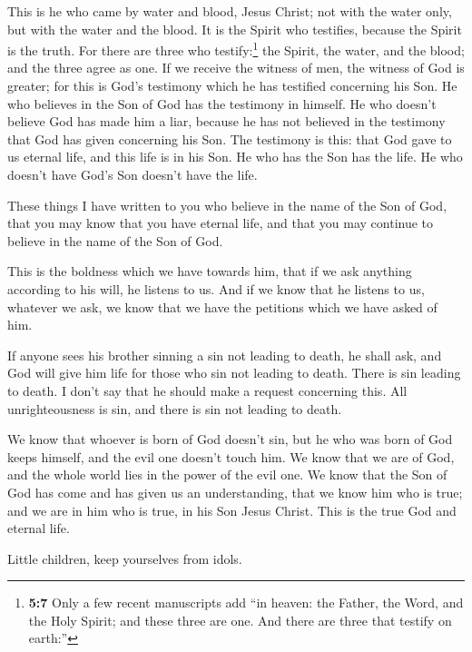 This is he who came by water and blood, Jesus Christ; not
with the water only, but with the water and the blood. It is the Spirit
who testifies, because the Spirit is the truth.  For there
are three who testify:\footnote{\textbf{5:7} Only a few recent
  manuscripts add ``in heaven: the Father, the Word, and the Holy
  Spirit; and these three are one. And there are three that testify on
  earth:''}  the Spirit, the water, and the blood; and the
three agree as one.  If we receive the witness of men, the
witness of God is greater; for this is God's testimony which he has
testified concerning his Son.  He who believes in the Son
of God has the testimony in himself. He who doesn't believe God has made
him a liar, because he has not believed in the testimony that God has
given concerning his Son.  The testimony is this: that
God gave to us eternal life, and this life is in his Son.
 He who has the Son has the life. He who doesn't have
God's Son doesn't have the life.

 These things I have written to you who believe in the
name of the Son of God, that you may know that you have eternal life,
and that you may continue to believe in the name of the Son of God.

 This is the boldness which we have towards him, that if
we ask anything according to his will, he listens to us. 
And if we know that he listens to us, whatever we ask, we know that we
have the petitions which we have asked of him.

 If anyone sees his brother sinning a sin not leading to
death, he shall ask, and God will give him life for those who sin not
leading to death. There is sin leading to death. I don't say that he
should make a request concerning this.  All
unrighteousness is sin, and there is sin not leading to death.

 We know that whoever is born of God doesn't sin, but he
who was born of God keeps himself, and the evil one doesn't touch him.
 We know that we are of God, and the whole world lies in
the power of the evil one.  We know that the Son of God
has come and has given us an understanding, that we know him who is
true; and we are in him who is true, in his Son Jesus Christ. This is
the true God and eternal life.

 Little children, keep yourselves from idols.
